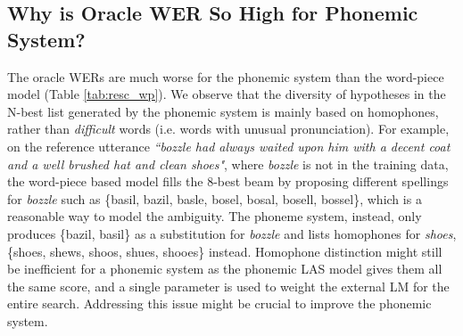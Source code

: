 \subsection{Why is Oracle WER So High for Phonemic System?}
      \vspace{-1mm}
The oracle WERs are much worse for the phonemic system than the word-piece model
(Table \ref{tab:resc_wp}).
We observe that the diversity of hypotheses in the N-best list generated by the phonemic
system is mainly based on homophones, rather than \textit{difficult} words (i.e. words with unusual
pronunciation).
For example, on the reference utterance \textit{``bozzle had always waited upon
	him with a decent coat and a well brushed hat and clean shoes"}, where
\textit{bozzle} is not in the training data, the word-piece based model fills the 8-best beam
by proposing different spellings for \textit{bozzle} such as \{basil, bazil,
basle, bosel, bosal, bosell, bossel\}, which is a reasonable way to model the ambiguity.
The phoneme system, instead, only produces \{bazil, basil\} as a substitution
for \textit{bozzle} and lists homophones for \textit{shoes}, \{shoes, shews,
shoos, shues, shooes\} instead.
Homophone distinction might still be inefficient for a phonemic system as the
phonemic LAS model gives them all the same score, and a single parameter is used
to weight the external LM for the entire search. 
Addressing this issue might be crucial to improve the phonemic system.
